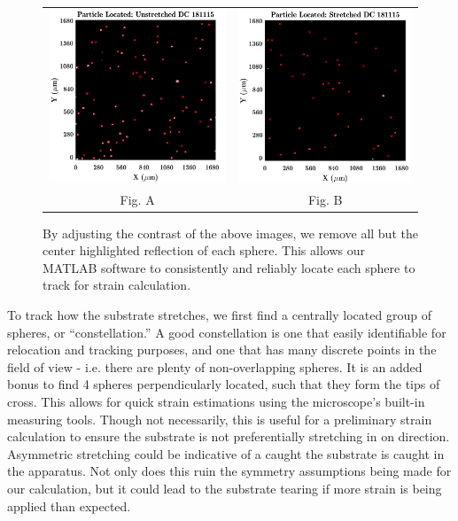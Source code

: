 \begin{figure}[h!]
	\begin{tabular}{cc}
		\includegraphics[width= .5\linewidth]{Chapters/Figures/particle_located_unstretched.pdf} & \includegraphics[width= .5\linewidth]{Chapters/Figures/particle_located_stretched.pdf}\\
		Fig. A & Fig. B
	\end{tabular}
	\caption[Particle-Locating for Stretch Calibration]{By adjusting the contrast of the above images, we remove all but the center highlighted reflection of each sphere. This allows our MATLAB software to consistently and reliably locate each sphere to track for strain calculation.}
	\label{fig:particleTracking}
\end{figure}


To track how the substrate stretches, we first find a centrally located group of spheres, or ``constellation.'' A good constellation is one that easily identifiable for relocation and tracking purposes, and one that has many discrete points in the field of view - i.e. there are plenty of non-overlapping spheres. It is an added bonus to find 4 spheres perpendicularly located, such that they form the tips of cross. This allows for quick strain estimations using the microscope's built-in measuring tools. Though not necessarily, this is useful for a preliminary strain calculation to ensure the substrate is not preferentially stretching in on direction. Asymmetric stretching could be indicative of a caught  the substrate is caught in the apparatus. Not only does this ruin the symmetry assumptions being made for our calculation, but it could lead to the substrate tearing if more strain is being applied than expected. 

